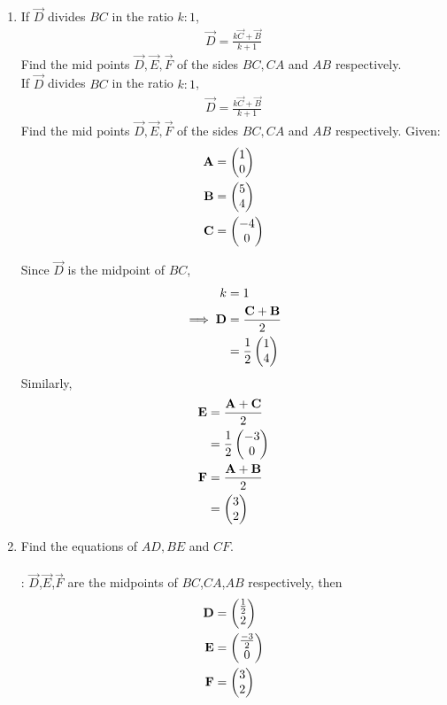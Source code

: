 \documentclass[11pt]{book}
\begin{document}
\begin{enumerate}[label=\thesection.\arabic*.,ref=\thesection.\theenumi]

\item  If $\vec{D}$ divides $BC$ in the ratio $k : 1$,
		\begin{align}
			\vec{D}= \frac{k\vec{C}+\vec{B}}{k+1}
		\end{align}
Find the mid points $\vec{D}, \vec{E}, \vec{F}$ of the sides $BC, CA$ and $AB$ respectively.\\
If $\vec{D}$ divides $BC$ in the ratio $k : 1$,
\begin{align}
\vec{D}= \frac{k\vec{C}+\vec{B}}{k+1}
\end{align}
Find the mid points $\vec{D}, \vec{E}, \vec{F}$ of the sides $BC, CA$ and $AB$ respectively.
\newline
Given:
\begin{align}
\mathbf{A} &= \begin{pmatrix}1\\0\\\end{pmatrix}\\
\mathbf{B} &= \begin{pmatrix}5\\4\\\end{pmatrix}\\
\mathbf{C} &= \begin{pmatrix}-4\\0\\\end{pmatrix}
\end{align}

\solution
Since $\vec{D}$ is the midpoint of $BC$,
\begin{align}
k &= 1\\
\implies \mathbf{D} &= \frac{\mathbf{C} + \mathbf{B}}{2}\\
&= \frac{1}{2}\begin{pmatrix}1\\4\end{pmatrix}
\end{align}
Similarly,
\begin{align}
\mathbf{E} &= \frac{\mathbf{A} + \mathbf{C}}{2}\\
&= \frac{1}{2}\begin{pmatrix}-3\\0\end{pmatrix}\\
\mathbf{F} &= \frac{\mathbf{A} + \mathbf{B}}{2}\\
&= \begin{pmatrix}3\\2\end{pmatrix}
\end{align} 

\item Find the equations of $AD, BE$ and $CF$.\\
\\ \solution:
$\vec{D}$,$\vec{E}$,$\vec{F}$ are the midpoints of $BC$,$CA$,$AB$ respectively, then\\
\begin{align}
 \mathbf{D} &=  \begin{pmatrix}\frac{1}{2}\\2\end{pmatrix}\\
 \mathbf{E} &=  \begin{pmatrix}\frac{-3}{2}\\0\end{pmatrix}\\
 \mathbf{F} &= \begin{pmatrix}3 \\2\end{pmatrix}
\end{align}
\begin{enumerate}


\end{enumerate}
\end{enumerate}
\end{document}
